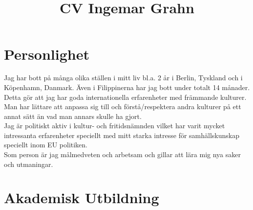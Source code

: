 \documentclass[a4paper]{twentysecondcv} %
\title{CV Ingemar Grahn}
\begin{document}
\makeprofile %


\section{Personlighet}

  Jag har bott på många olika ställen i mitt liv bl.a. 2 år i Berlin, Tyskland och i
 Köpenhamn, Danmark. Även i Filippinerna har jag bott under totalt 14 månader. Detta
 gör att jag har goda internationella erfarenheter med främmande kulturer. Man har
 lättare att anpassa sig till och förstå/respektera andra kulturer på ett annat sätt än 
 vad man annars skulle ha gjort.
\\
   Jag är politiskt aktiv i kultur- och fritidsnämnden vilket har varit mycket intressanta
  erfarenheter speciellt med mitt starka intresse för samhällskunskap speciellt inom EU
  politiken.
 \\
   Som person är jag målmedveten och arbetsam och gillar att lära mig nya saker och
  utmaningar.

%

\section{Akademisk Utbildning} %
\end{document}
